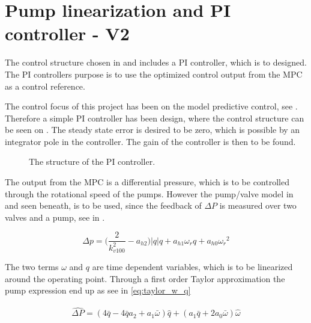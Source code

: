 \chapter{Pump linearization and PI controller - V2}
\label{cha:linear_pump2}

The control structure chosen in  and  includes a PI controller, which is to designed. The PI controllers purpose is to use the optimized control output from the MPC as a control reference. 

The control focus of this project has been on the model predictive control, see . Therefore a simple PI controller has been design, where the control structure can be seen on . The steady state error is desired to be zero, which is possible by an integrator pole in the controller. The gain of the controller is then to be found. 

\begin{figure}[H]
\centering
  
\caption{The structure of the PI controller.}
\label{fig:simple_PI}
\end{figure}

The output from the MPC is a differential pressure, which is to be controlled through the rotational speed of the pumps. However the pump/valve model in  and seen beneath, is to be used, since the feedback of $\Delta P$ is measured over two valves and a pump, see  in .

\begin{equation*}
 \Delta p = \Big(\frac{2}{k_{v100}^2} - a_{h2}\Big)|q| q  + a_{h1} \omega_r q + a_{h0}{\omega_r}^2
\end{equation*}

The two terms $\omega$ and $q$ are time dependent variables, which is to be linearized around the operating point. Through a first order Taylor approximation the pump expression end up as see in \eqref{eq:taylor_w_q}

\begin{equation}
	\begin{split}
	\hat{\Delta P} = (4\bar{q}-4\bar{q}a_2+a_1\bar{\omega})\hat{q} + (a_1\bar{q} + 2a_0\bar{\omega})\hat{\omega}
	\end{split}
	\label{eq:taylor_w_q}
\end{equation}

